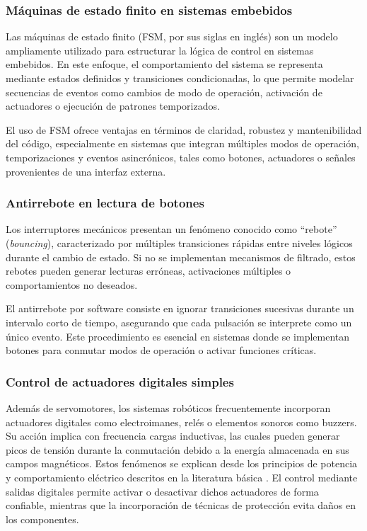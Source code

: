 \subsubsection{Máquinas de estado finito en sistemas embebidos}

Las máquinas de estado finito (FSM, por sus siglas en inglés) son un modelo ampliamente utilizado para estructurar la lógica de control en sistemas embebidos. En este enfoque, el comportamiento del sistema se representa mediante estados definidos y transiciones condicionadas, lo que permite modelar secuencias de eventos como cambios de modo de operación, activación de actuadores o ejecución de patrones temporizados.

\vspace{1em}

El uso de FSM ofrece ventajas en términos de claridad, robustez y mantenibilidad del código, especialmente en sistemas que integran múltiples modos de operación, temporizaciones y eventos asincrónicos, tales como botones, actuadores o señales provenientes de una interfaz externa.

\subsubsection{Antirrebote en lectura de botones}

Los interruptores mecánicos presentan un fenómeno conocido como ``rebote'' (\emph{bouncing}), caracterizado por múltiples transiciones rápidas entre niveles lógicos durante el cambio de estado. Si no se implementan mecanismos de filtrado, estos rebotes pueden generar lecturas erróneas, activaciones múltiples o comportamientos no deseados.

\vspace{1em}

El antirrebote por software consiste en ignorar transiciones sucesivas durante un intervalo corto de tiempo, asegurando que cada pulsación se interprete como un único evento. Este procedimiento es esencial en sistemas donde se implementan botones para conmutar modos de operación o activar funciones críticas.

\subsubsection{Control de actuadores digitales simples}

Además de servomotores, los sistemas robóticos frecuentemente incorporan actuadores digitales como electroimanes, relés o elementos sonoros como buzzers. Su acción implica con frecuencia cargas inductivas, las cuales pueden generar picos de tensión durante la conmutación debido a la energía almacenada en sus campos magnéticos. Estos fenómenos se explican desde los principios de potencia y comportamiento eléctrico descritos en la literatura básica \cite{openstax_power_2020}. El control mediante salidas digitales permite activar o desactivar dichos actuadores de forma confiable, mientras que la incorporación de técnicas de protección evita daños en los componentes.


